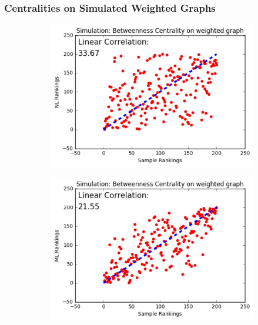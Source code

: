 \documentclass[9pt]{beamer}
\begin{document}
\begin{frame}
\frametitle{Centralities on Simulated Weighted Graphs}
\vspace{0.15in}
\begin{figure}[H]
\centering
\begin{subfigure}{.32\textwidth}
  \centering
  \includegraphics[width=0.95\linewidth]{BCW_NL.jpeg}
\end{subfigure}
\begin{subfigure}{.32\textwidth}
	\centering
    \includegraphics[width=0.95\linewidth]{BCW_ML.jpeg}
\end{subfigure}
\begin{subfigure}{.32\textwidth}
	\centering

\end{subfigure}
\end{figure}
\end{frame}
\end{document}
